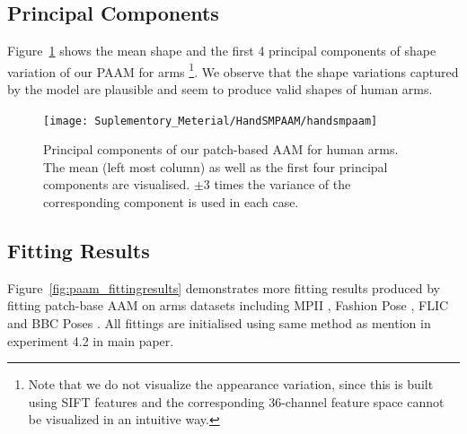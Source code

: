 \subsection{Principal Components}
\label{sec:paam_sm}


    

Figure~\ref{fig:paam_sm} shows the mean shape and the first 4 principal components of shape variation of our PAAM for arms \footnote{Note that we do not visualize the appearance variation, since this is built using SIFT features and the corresponding 36-channel feature space cannot be visualized in an intuitive way.}. We observe that the shape variations captured by the model are plausible and seem to produce valid shapes of human arms.

\begin{figure}[!b]
\centering
\texttt{[image: Suplementory\_Meterial/HandSMPAAM/handsmpaam]}
\caption{Principal components of our patch-based AAM for human arms.  The mean (left most column) as well as the first four principal components are visualised. $\pm 3$ times the variance of the corresponding component is used in each case.}
\label{fig:paam_sm}
\end{figure}





\subsection{Fitting Results}
\label{sec:paam_fittingresults}


Figure~\ref{fig:paam_fittingresults} demonstrates more fitting results produced by fitting patch-base AAM on arms datasets including MPII \cite{andriluka14cvpr}, Fashion Pose \cite{dantone2013human}, FLIC \cite{sapp2013modec} and BBC Poses \cite{pfister2015flowing}. All fittings are initialised using same method as mention in experiment 4.2 in main paper.



